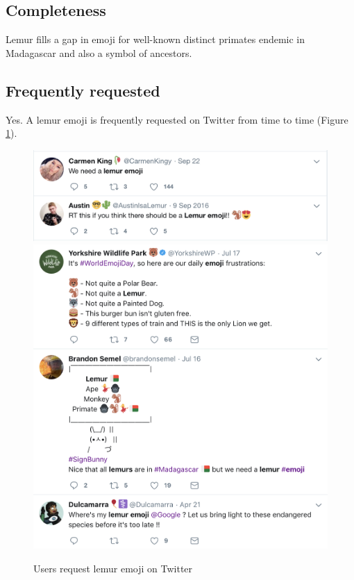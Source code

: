\documentclass{article}
\begin{document}
\subsection{Completeness}
Lemur fills a gap in emoji for well-known distinct primates endemic in Madagascar and also a symbol of ancestors.

\subsection{Frequently requested}
Yes. A lemur emoji is frequently requested on Twitter from time to time (Figure \ref{fig:request-lemur-evidence-tweet}).

\begin{figure}
    \includegraphics[width=\linewidth]{img/request-lemur-evidence-tweet-1.png}
    \includegraphics[width=\linewidth]{img/request-lemur-evidence-tweet-2.png}
    \caption{Users request lemur emoji on Twitter}
    \label{fig:request-lemur-evidence-tweet}
  \end{figure}
\end{document}
